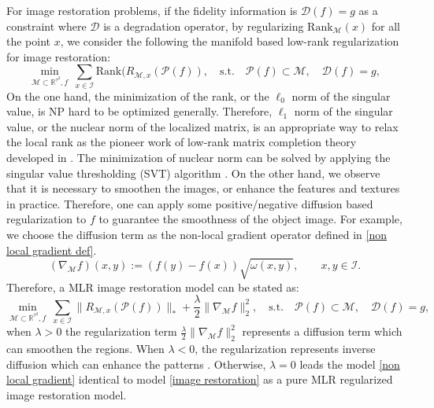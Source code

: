 \documentclass[letterpaper,10pt]{article}
\newcommand{\R}{\mathbb{R}}
\def\M{\mathcal{M}}
\def\Rank{\mathrm{Rank}}
\begin{document}
For image restoration problems, if the fidelity information is $\mathcal{D}(f) = g$ as a constraint where $\mathcal{D}$ is a degradation operator, by regularizing $\text{Rank}_\M(x)$ for all the point $x$, we consider the following the manifold based low-rank regularization for image restoration:
\begin{equation}\label{image restoration}
\min_{\mathcal{M} \subset \R^{\tau^2} , f} ~\sum_{x \in \mathscr{I}} \Rank(R_{\mathcal{M},x} (\mathcal{P}(f)), \quad \text{s.t.}\quad \mathcal{P}(f) \subset \mathcal{M}, \quad \mathcal{D}(f) = g,
\end{equation}
On the one hand, the minimization of the rank, or the $\ell_0$ norm of the singular value, is NP hard to  be optimized generally.  Therefore,  $\ell_1$ norm of the singular value, or the nuclear norm of the localized matrix, is an appropriate way to relax the local rank as the pioneer work of low-rank matrix completion theory developed in \cite{CandesRe2008}. The minimization of nuclear norm can be solved by applying the singular value thresholding (SVT) algorithm \cite{cai2010singular}. On the other hand, we observe that it is necessary to smoothen the images, or enhance the features and textures in practice. Therefore, one can apply some positive/negative diffusion based regularization \cite{gilboa2002forward} to $f$ to guarantee the smoothness of the object image. For example, we choose the diffusion term as the non-local gradient operator defined in \eqref{non local gradient def}.
\begin{equation}\label{non local gradient def}
(\nabla_\mathcal{M} f)(x,y):=(f(y)-f(x))\sqrt{\omega(x,y)}, \qquad x,y \in \mathscr{I}.
\end{equation}
Therefore, a MLR image restoration model can be stated as:
\begin{equation}\label{non local gradient}
\min_{\mathcal{M} \subset \R^{\tau^2} , f} ~\sum_{x \in \mathscr{I}}  \|R_{\mathcal{M},x} (\mathcal{P}(f)) \|_* +\frac{\lambda}{2}\|\nabla_\mathcal{M} f\|_2^2, \quad \text{s.t.}\quad \mathcal{P}(f) \subset \mathcal{M}, \quad \mathcal{D}(f) = g,
\end{equation}
when $\lambda>0$ the regularization term $\frac{\lambda}{2}\|\nabla_\mathcal{M} f\|_2^2$ represents a diffusion term which can smoothen the regions. When $\lambda<0$, the regularization represents inverse diffusion which can enhance the patterns \cite{gilboa2002forward,gilboa2004,buades2006image}. Otherwise, $\lambda=0$ leads the model \eqref{non local gradient} identical to model \eqref{image restoration} as a pure MLR regularized image restoration model.
\end{document}

